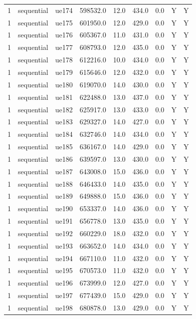 \begin{table}[ht]
\begin{tabular}{|c|c|c|c|c|c|c|c|c|}
1 & sequential & ue174 & 598532.0 & 12.0 & 434.0 & 0.0 & Y & Y \\
1 & sequential & ue175 & 601950.0 & 12.0 & 429.0 & 0.0 & Y & Y \\
1 & sequential & ue176 & 605367.0 & 11.0 & 431.0 & 0.0 & Y & Y \\
1 & sequential & ue177 & 608793.0 & 12.0 & 435.0 & 0.0 & Y & Y \\
1 & sequential & ue178 & 612216.0 & 10.0 & 434.0 & 0.0 & Y & Y \\
1 & sequential & ue179 & 615646.0 & 12.0 & 432.0 & 0.0 & Y & Y \\
1 & sequential & ue180 & 619070.0 & 14.0 & 430.0 & 0.0 & Y & Y \\
1 & sequential & ue181 & 622488.0 & 13.0 & 437.0 & 0.0 & Y & Y \\
1 & sequential & ue182 & 625917.0 & 13.0 & 433.0 & 0.0 & Y & Y \\
1 & sequential & ue183 & 629327.0 & 14.0 & 427.0 & 0.0 & Y & Y \\
1 & sequential & ue184 & 632746.0 & 14.0 & 434.0 & 0.0 & Y & Y \\
1 & sequential & ue185 & 636167.0 & 14.0 & 429.0 & 0.0 & Y & Y \\
1 & sequential & ue186 & 639597.0 & 13.0 & 430.0 & 0.0 & Y & Y \\
1 & sequential & ue187 & 643008.0 & 15.0 & 436.0 & 0.0 & Y & Y \\
1 & sequential & ue188 & 646433.0 & 14.0 & 435.0 & 0.0 & Y & Y \\
1 & sequential & ue189 & 649888.0 & 15.0 & 436.0 & 0.0 & Y & Y \\
1 & sequential & ue190 & 653337.0 & 14.0 & 436.0 & 0.0 & Y & Y \\
1 & sequential & ue191 & 656778.0 & 13.0 & 435.0 & 0.0 & Y & Y \\
1 & sequential & ue192 & 660229.0 & 18.0 & 432.0 & 0.0 & Y & Y \\
1 & sequential & ue193 & 663652.0 & 14.0 & 434.0 & 0.0 & Y & Y \\
1 & sequential & ue194 & 667110.0 & 11.0 & 432.0 & 0.0 & Y & Y \\
1 & sequential & ue195 & 670573.0 & 11.0 & 432.0 & 0.0 & Y & Y \\
1 & sequential & ue196 & 673999.0 & 12.0 & 427.0 & 0.0 & Y & Y \\
1 & sequential & ue197 & 677439.0 & 15.0 & 429.0 & 0.0 & Y & Y \\
1 & sequential & ue198 & 680878.0 & 13.0 & 429.0 & 0.0 & Y & Y \\

\end{tabular}
\end{table}
